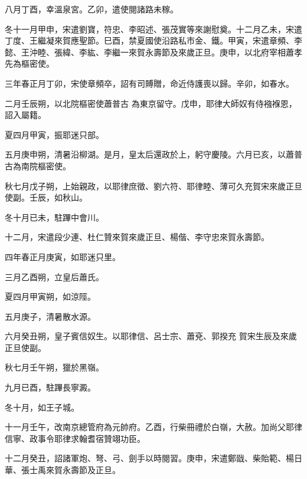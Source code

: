 \begin{pinyinscope}
 八月丁酉，幸溫泉宮。乙卯，遣使閱諸路未稼。



 冬十一月甲申，宋遣劉寶，符忠、李昭述、張茂實等來謝慰奠。十二月乙未，宋遣丁度、王繼凝來賀應聖節。巳酉，禁夏國使沿路私市金、鐵。甲寅，宋遣章頻、李懿、王沖睦、張緯、李紘、李繼一來賀永壽節及來歲正旦。庚申，以北府宰相蕭孝先為樞密使。



 三年春正月丁卯，宋使章頻卒，詔有司賻贈，命近侍護喪以歸。辛卯，如春水。



 二月壬辰朔，以北院樞密使蕭普古
 為東京留守。戊申，耶律大師奴有侍襁褓恩，詔入屬籍。



 夏四月甲寅，振耶迷只部。



 五月庚申朔，清暑沿柳湖。是月，皇太后還政於上，躬守慶陵。六月已亥，以蕭普古為南院樞密使。



 秋七月戊子朔，上始親政，以耶律庶徵、劉六符、耶律睦、薄可久充賀宋來歲正旦使副。壬辰，如秋山。



 冬十月已未，駐蹕中會川。



 十二月，宋遣段少連、杜仁贊來賀來歲正旦、楊偕、李守忠來賀永壽節。



 四年春正月庚寅，如耶迷只里。



 三月乙酉朔，立皇后蕭氏。



 夏四月甲寅朔，如涼陘。



 五月庚子，清暑散水源。



 六月癸丑朔，皇子賓信奴生。以耶律信、呂士宗、蕭兗、郭揆充
 賀宋生辰及來歲正旦使副。



 秋七月壬午朔，獵於黑嶺。



 九月已酉，駐蹕長寧澱。



 冬十月，如王子城。



 十一月壬午，改南京總管府為元帥府。乙酉，行柴冊禮於白嶺，大赦。加尚父耶律信寧、政事令耶律求翰耆宿贊翊功臣。



 十二月癸丑，詔諸軍炮、弩、弓、劍手以時閱習。庚申，宋遣鄭戩、柴貽範、楊日華、張士禹來賀永壽節及正旦。




\end{pinyinscope}
